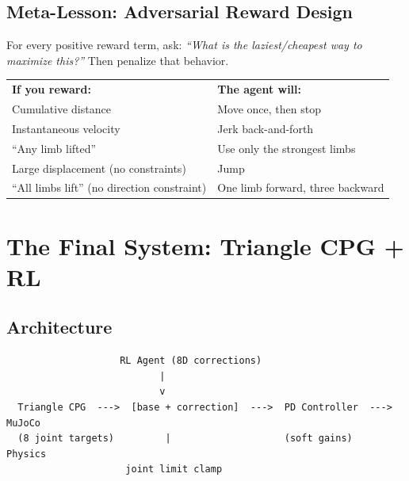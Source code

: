 \documentclass[11pt, a4paper]{article}
\begin{document}

\subsection{Meta-Lesson: Adversarial Reward Design}

\begin{insightbox}
For every positive reward term, ask: \textit{``What is the laziest/cheapest way to maximize this?''} Then penalize that behavior.

\vspace{4pt}\small
\begin{tabular}{ll}
\textbf{If you reward:} & \textbf{The agent will:} \\
Cumulative distance & Move once, then stop \\
Instantaneous velocity & Jerk back-and-forth \\
``Any limb lifted'' & Use only the strongest limbs \\
Large displacement (no constraints) & Jump \\
``All limbs lift'' (no direction constraint) & One limb forward, three backward \\
\end{tabular}
\end{insightbox}

\section{The Final System: Triangle CPG + RL}

\subsection{Architecture}

\begin{verbatim}
                    RL Agent (8D corrections)
                           |
                           v
  Triangle CPG  --->  [base + correction]  --->  PD Controller  --->  MuJoCo
  (8 joint targets)         |                    (soft gains)        Physics
                     joint limit clamp
\end{verbatim}
\end{document}
